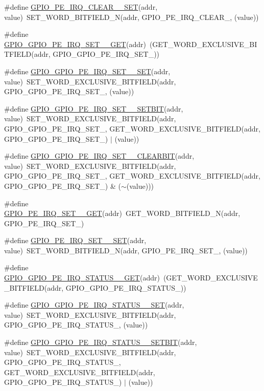 \begin{DoxyCompactItemize}
\item 
\#define \hyperlink{a00554_a5efcf436c528ea75fa9606d7f5bf4a1a}{GPIO\_\-PE\_\-IRQ\_\-CLEAR\_\_\-SET}(addr, value)~SET\_\-WORD\_\-BITFIELD\_\-N(addr, GPIO\_\-PE\_\-IRQ\_\-CLEAR\_, (value))
\item 
\#define \hyperlink{a00554_ad0d3e2fd0b5aff2462382ae05912a280}{GPIO\_\-GPIO\_\-PE\_\-IRQ\_\-SET\_\_\-GET}(addr)~(GET\_\-WORD\_\-EXCLUSIVE\_\-BITFIELD(addr, GPIO\_\-GPIO\_\-PE\_\-IRQ\_\-SET\_))
\item 
\#define \hyperlink{a00554_ad5f317f469af494b35eb6b4a040c886d}{GPIO\_\-GPIO\_\-PE\_\-IRQ\_\-SET\_\_\-SET}(addr, value)~SET\_\-WORD\_\-EXCLUSIVE\_\-BITFIELD(addr, GPIO\_\-GPIO\_\-PE\_\-IRQ\_\-SET\_, (value))
\item 
\#define \hyperlink{a00554_a2dd3152b24eded90474342fd60381138}{GPIO\_\-GPIO\_\-PE\_\-IRQ\_\-SET\_\_\-SETBIT}(addr, value)~SET\_\-WORD\_\-EXCLUSIVE\_\-BITFIELD(addr, GPIO\_\-GPIO\_\-PE\_\-IRQ\_\-SET\_, GET\_\-WORD\_\-EXCLUSIVE\_\-BITFIELD(addr, GPIO\_\-GPIO\_\-PE\_\-IRQ\_\-SET\_) $|$ (value))
\item 
\#define \hyperlink{a00554_a2d73bccc6866dd99fc279751961522ea}{GPIO\_\-GPIO\_\-PE\_\-IRQ\_\-SET\_\_\-CLEARBIT}(addr, value)~SET\_\-WORD\_\-EXCLUSIVE\_\-BITFIELD(addr, GPIO\_\-GPIO\_\-PE\_\-IRQ\_\-SET\_, GET\_\-WORD\_\-EXCLUSIVE\_\-BITFIELD(addr, GPIO\_\-GPIO\_\-PE\_\-IRQ\_\-SET\_) \& ($\sim$(value)))
\item 
\#define \hyperlink{a00554_a176ef07bede179a67bd4f90a92c4a218}{GPIO\_\-PE\_\-IRQ\_\-SET\_\_\-GET}(addr)~GET\_\-WORD\_\-BITFIELD\_\-N(addr, GPIO\_\-PE\_\-IRQ\_\-SET\_)
\item 
\#define \hyperlink{a00554_ac9a33442d81d56c64677717ca781ec9e}{GPIO\_\-PE\_\-IRQ\_\-SET\_\_\-SET}(addr, value)~SET\_\-WORD\_\-BITFIELD\_\-N(addr, GPIO\_\-PE\_\-IRQ\_\-SET\_, (value))
\item 
\#define \hyperlink{a00554_a191020a054010c8551c40a992401b49d}{GPIO\_\-GPIO\_\-PE\_\-IRQ\_\-STATUS\_\_\-GET}(addr)~(GET\_\-WORD\_\-EXCLUSIVE\_\-BITFIELD(addr, GPIO\_\-GPIO\_\-PE\_\-IRQ\_\-STATUS\_))
\item 
\#define \hyperlink{a00554_aac0ee13d386ec586213fe1fb571efc1a}{GPIO\_\-GPIO\_\-PE\_\-IRQ\_\-STATUS\_\_\-SET}(addr, value)~SET\_\-WORD\_\-EXCLUSIVE\_\-BITFIELD(addr, GPIO\_\-GPIO\_\-PE\_\-IRQ\_\-STATUS\_, (value))
\item 
\#define \hyperlink{a00554_ad465ade5eb334375b28a856ecf57847d}{GPIO\_\-GPIO\_\-PE\_\-IRQ\_\-STATUS\_\_\-SETBIT}(addr, value)~SET\_\-WORD\_\-EXCLUSIVE\_\-BITFIELD(addr, GPIO\_\-GPIO\_\-PE\_\-IRQ\_\-STATUS\_, GET\_\-WORD\_\-EXCLUSIVE\_\-BITFIELD(addr, GPIO\_\-GPIO\_\-PE\_\-IRQ\_\-STATUS\_) $|$ (value))

\end{DoxyCompactItemize}
